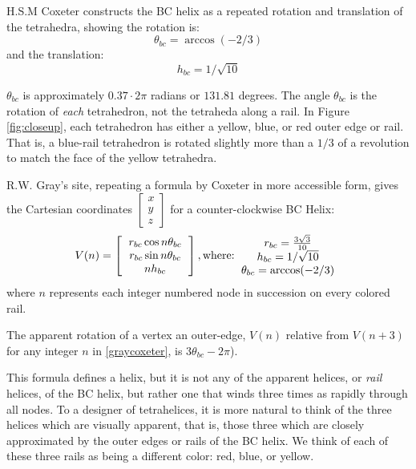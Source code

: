 \documentclass[11pt]{article}
\begin{document}
H.S.M Coxeter constructs the BC helix\cite{coxeter1985simplicial} as a repeated rotation and translation of the tetrahedra, showing the
rotation is:
\[
\theta_{bc} = \arccos(-2/3) 
\]
and the translation:
\[
h_{bc} = 1/\sqrt{10}
\]

$\theta_{bc}$ is approximately $0.37 \cdot 2 \pi$ radians or  $131.81$ degrees.
The angle $\theta_{bc}$ is the rotation of \emph{each} tetrahedron, not the tetraheda along a rail.  In Figure \ref{fig:closeup},
each tetrahedron has either a yellow, blue, or red outer edge or rail.
That is, a blue-rail tetrahedron is rotated slightly more than a $1/3$ of a revolution to match the face of the yellow tetrahedra.

R.W. Gray's site\cite{graytetrahelix}, repeating a formula by Coxeter\cite{coxeter1985simplicial} in more accessible form, gives the Cartesian coordinates $\begin{bmatrix}
           x \\
           y \\
           z
         \end{bmatrix}$
for a counter-clockwise BC Helix:
\begin{equation}
  \label{graycoxeter}
V(n) =
\left [
  \begin{tabular}{c}
   $ r_{bc} \cos{n \theta_{bc}} $\\
   $ r_{bc} \sin{n \theta_{bc}} $\\
   $ n h_{bc}  $
  \end{tabular}
  \right ],
\text{where:}
  \begin{tabular}{c}
 $ r_{bc} = \frac{3\sqrt{3}}{10} $\\
 $ h_{bc} = 1/\sqrt{10} $ \\
 $ \theta_{bc} = \arccos(-2/3) $ \\
  \end{tabular}      
\end{equation}
where $n$ represents each integer numbered node in succession on every colored rail.

The apparent rotation of a vertex an outer-edge, $V(n)$ relative from $V(n+3)$ for any integer $n$
in \eqref{graycoxeter}, is $3 \theta_{bc} - 2\pi$).

This formula defines a helix, but it is not any of the apparent helices, or \emph{rail} helices, of the
BC helix, but rather one that winds three times as rapidly through all
nodes. To a designer of tetrahelices, it is more natural to think of
the three helices which are visually apparent, that is, those three
which are closely approximated by the outer edges or rails of
the BC helix. We think of each of these three rails as being a different color: red, blue, or yellow.
\end{document}
